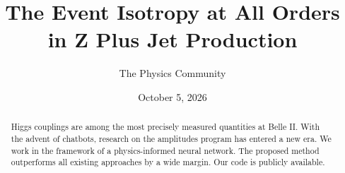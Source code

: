 \documentclass[11pt]{article}
\title{The Event Isotropy at All Orders in Z Plus Jet Production}
\author{The Physics Community}
\date{October 5, 2026}
\numberwithin{equation}{section}
\theoremstyle{definition}
\theoremstyle{remark}
\begin{document}
\maketitle
\begin{abstract}
Higgs couplings are among the most precisely measured quantities at
Belle II. With the advent of chatbots, research on the amplitudes
program has entered a new era. We work in the framework of a
physics-informed neural network. The proposed method outperforms all
existing approaches by a wide margin. Our code is publicly available.
\end{abstract}
\tableofcontents





\nocite{*}


\end{document}

